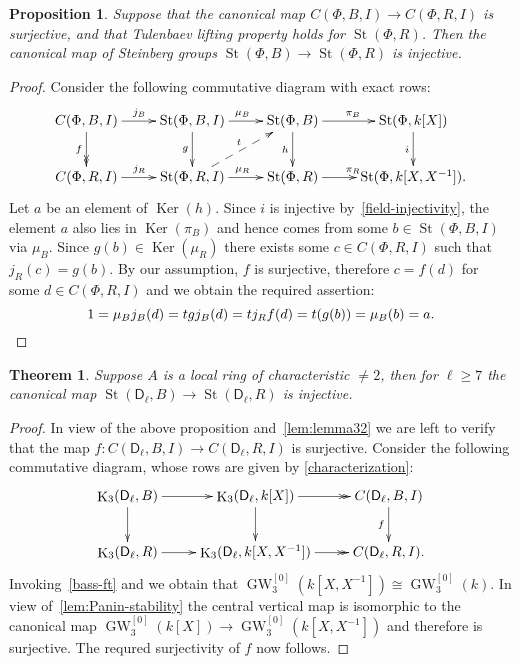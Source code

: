 \documentclass[oneside, 10pt]{amsart}
\newtheorem{prop}{Proposition}
\newtheorem{theorem}{Theorem}
\theoremstyle{remark}
\theoremstyle{definition}
\DeclareMathOperator{\Ker}{Ker}
\DeclareMathOperator{\St}{St}
\DeclareMathOperator{\K}{K}
\DeclareMathOperator{\GW}{GW}
\newcommand{\rD}{\mathsf{D}}
\numberwithin{equation}{section}
\begin{document}
\begin{prop}
 Suppose that the canonical map $C(\Phi, B, I) \to C(\Phi, R, I)$ is surjective,
  and that Tulenbaev lifting property holds for $\St(\Phi, R)$. 
 Then the canonical map of Steinberg groups $\St(\Phi, B) \to \St(\Phi, R)$ is injective.
\end{prop}
\begin{proof}
 Consider the following commutative diagram with exact rows: 
\begin{equation*} \xymatrix{
 C(\Phi, B, I) \ar[r]^{j_B} \ar@{->>}[d]_{f} & \St(\Phi, B, I) \ar[r]^{\mu_B} \ar[d]_{g} &
 \St(\Phi, B) \ar[r]^{\pi_B} \ar[d]_{h} & \St(\Phi, k[X]) \ar[d]_{i} \\
 C(\Phi, R, I) \ar[r]^{j_R}         & \St(\Phi, R, I) \ar[r]^{\mu_R} \ar@{-->}[ur]^{t}&
 \St(\Phi, R) \ar[r]^{\pi_R}        & \St(\Phi, k[X, X^{-1}]).
}\end{equation*}
Let $a$ be an element of $\Ker(h)$. Since $i$ is injective by~\cref{field-injectivity}, the element $a$ also lies in $\Ker(\pi_B)$ and hence comes from some $b \in \St(\Phi, B, I)$ via $\mu_B$. Since $g(b) \in \Ker(\mu_R)$ there exists some $c \in C(\Phi, R, I)$ such that $j_R(c) = g(b)$. By our assumption, $f$ is surjective, therefore
 $c = f(d)$ for some $d \in C(\Phi, R, I)$ and we obtain the required assertion:
 \[ 1 = \mu_Bj_B(d) = tgj_B(d) = tj_Rf(d) =t(g(b)) = \mu_B(b) = a. \qedhere \]

\end{proof}

\begin{theorem} Suppose $A$ is a local ring of characteristic $\neq 2$, then for $\ell \geq 7$
  the canonical map $\St(\rD_\ell, B) \to \St(\rD_\ell, R)$ is injective.
\end{theorem}
\begin{proof}
 In view of the above proposition and~\cref{lem:lemma32} we are left to verify that the map $f\colon C(\rD_\ell, B, I) \to C(\rD_\ell, R, I)$ is surjective. Consider the following commutative diagram, whose rows are given by \cref{characterization}:
 \begin{equation*}\xymatrix{
  \K_3(\rD_\ell, B) \ar[r] \ar[d] & \K_3(\rD_\ell, k[X]) \ar[d] \ar@{->>}[r] & \ar[d]_{f} C(\rD_\ell, B, I) \\
  \K_3(\rD_\ell, R) \ar[r]        & \K_3(\rD_\ell, k[X, X^{-1}]) \ar@{->>}[r]        & C(\rD_\ell, R, I).}\end{equation*}
 Invoking~\cref{bass-ft} and \cite[Lemma~2.2]{FRS12} we obtain that $\GW_3^{[0]}(k[X, X^{-1}]) \cong \GW_3^{[0]}(k)$.
 In view of~\cref{lem:Panin-stability} the central vertical map is isomorphic to the canonical map
 $\GW_3^{[0]}(k[X]) \to \GW_3^{[0]}(k[X, X^{-1}])$ and therefore is surjective. The requred surjectivity of $f$ now follows.
\end{proof}
\end{document}
